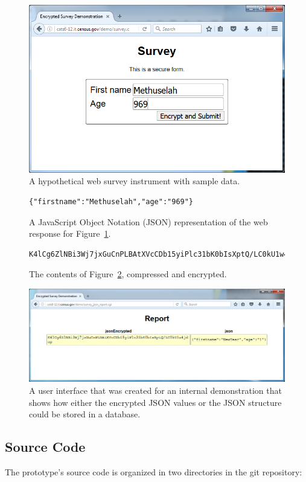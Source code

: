\documentclass[fleqn,10pt]{wlscirep}
\begin{document}
\begin{figure}
  \centering
  \includegraphics[width=.5\linewidth]{art/figure1}
  \caption{A hypothetical web survey instrument with sample data.}\label{survey}
  \end{figure}

\begin{figure}
  \begin{Verbatim}[frame=single]
    {"firstname":"Methuselah","age":"969"}
  \end{Verbatim}

  \caption{A JavaScript Object Notation (JSON) representation of the web response for Figure~\ref{survey}.}\label{json}
\end{figure}

\begin{figure}
  \begin{Verbatim}[frame=single]
    K4lCg6ZlNBi3Wj7jxGuCnPLBAtXVcCDb15yiPlc31bK0bIsXptQ/LC0kU1w4jdop
  \end{Verbatim}
  \caption{The contents of Figure~\ref{json}, compressed and encrypted.}\label{encrypted}
\end{figure}

\begin{figure}
  \centering
  \includegraphics[width=.5\linewidth]{art/figure3}
  \caption{A user interface that was created for an internal
    demonstration that shows how either the encrypted JSON values or
    the JSON structure could be stored in a database.}\label{figure-demo}
  \end{figure}



\subsection{Source Code}
The prototype's source code is organized in two directories in the git repository:
\end{document}

